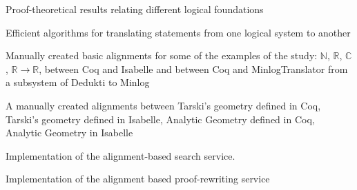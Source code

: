 \begin{workpackage}
\begin{wpdelivs}
  \begin{wpdeliv}[due=24,miles=startup,id=prooftheoretical,dissem=PU,nature=DEM,lead=Lee]
    {Proof-theoretical results relating different logical foundations}
  \end{wpdeliv}
  \begin{wpdeliv}[due=42,miles=startup,id=translatingstatements,dissem=PU,nature=DEM,lead=Lee]
    {Efficient algorithms for translating statements from one logical system to another}
  \end{wpdeliv}
  \begin{wpdeliv}[due=24,miles=startup,id=aligningnumbers,dissem=PU,nature=DEM,lead=Str]
    {Manually created basic alignments for some of the examples of the
      study: $\mathbb{N}$, $\mathbb{R}$, $\mathbb{C}$, $\mathbb{R}
      \rightarrow \mathbb{R}$, between Coq and Isabelle and between
      Coq and MinlogTranslator from a subsystem of Dedukti to
      Minlog}
  \end{wpdeliv}
  \begin{wpdeliv}[due=36,miles=startup,id=aligninggeometries,dissem=PU,nature=DEM,lead=Bel]
    {A manually created alignments between Tarski's geometry defined
      in Coq, Tarski's geometry defined in Isabelle, Analytic Geometry
      defined in Coq, Analytic Geometry in Isabelle}
  \end{wpdeliv}
  \begin{wpdeliv}[due=48,miles=???,id=alignsearch,dissem=PU,nature=DEM,lead=Fau]
    {Implementation of the alignment-based search service.}
  \end{wpdeliv}
  \begin{wpdeliv}[due=48,miles=???,id=alignproofrewr,dissem=PU,nature=DEM,lead=Bol]
    {Implementation of the alignment based proof-rewriting service}
  \end{wpdeliv}

\end{wpdelivs}
\end{workpackage}


